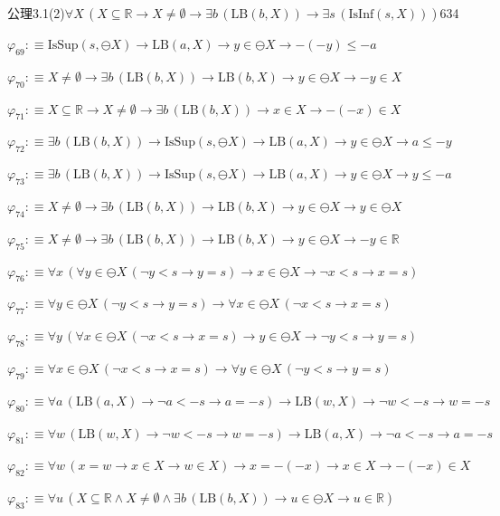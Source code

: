 \begin{fullproof}{公理3.1(2)}{$\forall X\,(X \subseteq \mathbb{R} \to X \neq \emptyset \to \exists b\,(\mathrm{LB}(b,X)) \to \exists s\,(\mathrm{IsInf}(s,X)))$}{634}
\begin{abbrevlist}
\item $\varphi_{69} :\equiv \mathrm{IsSup}(s,\ominus X) \to \mathrm{LB}(a,X) \to y \in \ominus X \to -(-y) \leq -a$
\item $\varphi_{70} :\equiv X \neq \emptyset \to \exists b\,(\mathrm{LB}(b,X)) \to \mathrm{LB}(b,X) \to y \in \ominus X \to -y \in X$
\item $\varphi_{71} :\equiv X \subseteq \mathbb{R} \to X \neq \emptyset \to \exists b\,(\mathrm{LB}(b,X)) \to x \in X \to -(-x) \in X$
\item $\varphi_{72} :\equiv \exists b\,(\mathrm{LB}(b,X)) \to \mathrm{IsSup}(s,\ominus X) \to \mathrm{LB}(a,X) \to y \in \ominus X \to a \leq -y$
\item $\varphi_{73} :\equiv \exists b\,(\mathrm{LB}(b,X)) \to \mathrm{IsSup}(s,\ominus X) \to \mathrm{LB}(a,X) \to y \in \ominus X \to y \leq -a$
\item $\varphi_{74} :\equiv X \neq \emptyset \to \exists b\,(\mathrm{LB}(b,X)) \to \mathrm{LB}(b,X) \to y \in \ominus X \to y \in \ominus X$
\item $\varphi_{75} :\equiv X \neq \emptyset \to \exists b\,(\mathrm{LB}(b,X)) \to \mathrm{LB}(b,X) \to y \in \ominus X \to -y \in \mathbb{R}$
\item $\varphi_{76} :\equiv \forall x\,(\forall y \in \ominus X\,(\neg y < s \to y = s) \to x \in \ominus X \to \neg x < s \to x = s)$
\item $\varphi_{77} :\equiv \forall y \in \ominus X\,(\neg y < s \to y = s) \to \forall x \in \ominus X\,(\neg x < s \to x = s)$
\item $\varphi_{78} :\equiv \forall y\,(\forall x \in \ominus X\,(\neg x < s \to x = s) \to y \in \ominus X \to \neg y < s \to y = s)$
\item $\varphi_{79} :\equiv \forall x \in \ominus X\,(\neg x < s \to x = s) \to \forall y \in \ominus X\,(\neg y < s \to y = s)$
\item $\varphi_{80} :\equiv \forall a\,(\mathrm{LB}(a,X) \to \neg a < -s \to a = -s) \to \mathrm{LB}(w,X) \to \neg w < -s \to w = -s$
\item $\varphi_{81} :\equiv \forall w\,(\mathrm{LB}(w,X) \to \neg w < -s \to w = -s) \to \mathrm{LB}(a,X) \to \neg a < -s \to a = -s$
\item $\varphi_{82} :\equiv \forall w\,(x = w \to x \in X \to w \in X) \to x = -(-x) \to x \in X \to -(-x) \in X$
\item $\varphi_{83} :\equiv \forall u\,(X \subseteq \mathbb{R} \land X \neq \emptyset \land \exists b\,(\mathrm{LB}(b,X)) \to u \in \ominus X \to u \in \mathbb{R})$

\end{abbrevlist}
\end{fullproof}
